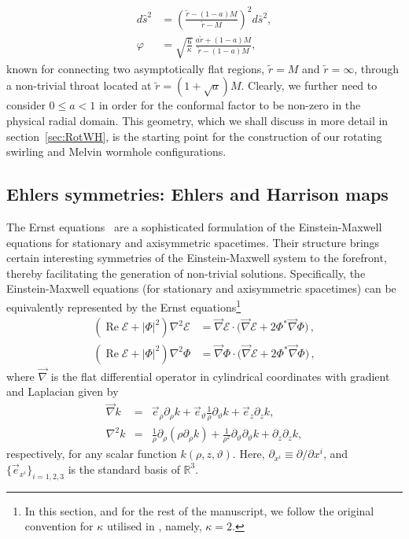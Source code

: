 \documentclass[aps,preprint,groupedaddress,nofootinbib,superscriptaddress,showkeys,showpacs,eqsecnum,amsmath,amssymb]{revtex4-1}
\newcommand{\ernst}{\mathcal{E}}
\renewcommand\Re{\operatorname{Re}}
\begin{document}
\begin{subequations}
\label{static-worm}
\begin{align}
d\hat{s}^2 &= \left( \frac{\tilde{r}-(1-a)M}{\tilde{r}-M} \right)^2 d\bar{s}^2,\\ 
\varphi &= \sqrt{\frac{6}{\kappa}} \, \frac{a\tilde{r} + (1-a)M}{\tilde{r}-(1-a)M}, 
\end{align} 
\end{subequations}
known for connecting two asymptotically flat regions, $\tilde r=M$ and $\tilde r=\infty$, through a non-trivial throat located at $\tilde{r}=(1+\sqrt{a})M$. Clearly, we further need to consider $0\leq a<1$ in order for the conformal factor to be non-zero in the physical radial domain. This geometry, which we shall discuss in more detail in section~\ref{sec:RotWH}, is the starting point for the construction of our rotating swirling and Melvin wormhole configurations. 

\subsection{Ehlers symmetries: Ehlers and Harrison maps\label{sec:EhlersSym}}

The Ernst equations~\cite{Ernst:1967wx,Ernst:1967by} are a sophisticated formulation of the Einstein-Maxwell equations for stationary and axisymmetric spacetimes. Their structure brings certain interesting symmetries of the Einstein-Maxwell system to the forefront, thereby facilitating the generation of non-trivial solutions. Specifically, the Einstein-Maxwell equations (for stationary and axisymmetric spacetimes) can be equivalently represented by the Ernst equations\footnote{In this section, and for the rest of the manuscript, we follow the original convention for $\kappa$ utilised in \cite{Ernst:1967wx,Ernst:1967by}, namely, $\kappa=2$.}
\begin{subequations}
\label{ernst-eqs}
\begin{align}
\left( \Re\ernst + \big|\Phi\big|^2 \right) \nabla^2\ernst & =
\vec{\nabla}\ernst\cdot \bigl( \vec\nabla\ernst + 2\Phi^* \vec\nabla\Phi \bigr) \,, \\
\left( \Re\ernst + \big|\Phi\big|^2 \right) \nabla^2\Phi & = \vec\nabla\Phi\cdot \bigl( \vec\nabla\ernst + 2\Phi^* \vec\nabla\Phi \bigr) \,,
\end{align}
\end{subequations}
where $\vec{\nabla}$ is the flat differential operator in cylindrical coordinates with gradient and Laplacian given by
\begin{subequations}
    \begin{eqnarray}
        \vec{\nabla} k &=& \vec{e}_\rho \partial_\rho k + \vec{e}_\vartheta\frac{1}{\rho}\partial_\vartheta k + \vec{e}_z \partial_zk,\\
        \nabla^2k &=& \frac{1}{\rho}\partial_\rho (\rho \partial_\rho k) + \frac{1}{\rho^2}\partial_\vartheta \partial_\vartheta k + \partial_z\partial_z k,
    \end{eqnarray}
\end{subequations}
respectively, for any scalar function $k(\rho,z,\vartheta)$. Here, $\partial_{x^i}\equiv \partial/\partial x^i$, and $\{\vec{e}_{x^i}\}_{i=1,2,3}$ is the standard basis of $\mathbb{R}^3$.
\end{document}
